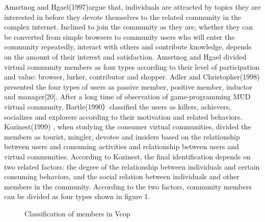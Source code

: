 \documentclass{elsarticle}
\begin{document}
Amsrtnog and Hgael(1997)argue that, individuals are attracted by topics they are interested in before they devote themselves to the related community in the complex internet. Inclined to join the community as they are, whether they can be converted from simple browsers to community users who will enter the community repeatedly, interact with others and contribute knowledge, depends on the amount of their interest and satisfaction. Amsrtnog and Hgael divided virtual community members as four types according to their level of participation and value: browser, lurker, contributor and shopper. Adler and Christopher(1998) presented the four types of users as passive member, positive member, inductor and manager[20]. After a long time of observation of game-programming MUD virtual community, Bartle(1990）classified the users as killers, achievers, socializes and explorers according to their motivation and related behaviors. Kozinest(1999) , when studying the consumer virtual communities, divided the members as tourist, mingler, devotee and insiders based on the relationship between users and consuming activities and relationship between users and virtual communities. According to Kozinest, the final identification depends on two related factors: the degree of the relationship between individuals and certain consuming behaviors, and the social relation between individuals and other members in the community. According to the two factors, community members can be divided as four types shown in figure 1.   
\begin{figure}[htpb]
  \centering
  \caption{Classification of members in Vcop}
  \label{fig:classification}
\end{figure}
\end{document}
